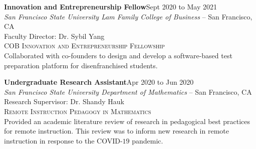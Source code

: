 \documentclass[hidelinks, 10pt]{article}
\begin{document}
{{\vspace{4mm}

\begin{minipage}[ct]{0.9\linewidth}
\textbf{Innovation and Entrepreneurship Fellow}\hfill Sept 2020 to May 2021\\
\emph{San Francisco State University Lam Family College of Business} -- San Francisco, CA\\
Faculty Director: Dr. Sybil Yang\\
{\textsc{COB Innovation and Entrepreneurship Fellowship}}
\vspace{1mm}\\
Collaborated with co-founders to design and develop a software-based test
preparation platform for disenfranchised students.
\end{minipage}

\vspace{4mm}

\begin{minipage}[ct]{0.9\linewidth}
\textbf{Undergraduate Research Assistant}\hfill Apr 2020 to Jun 2020\\
\emph{San Francisco State University Department of Mathematics} -- San Francisco, CA\\
Research Supervisor: Dr. Shandy Hauk\\
{\textsc{Remote Instruction Pedagogy in Mathematics}}
\vspace{1mm}\\
Provided an academic literature review of research in pedagogical best practices
for remote instruction.  This review was to inform new research in remote
instruction in response to the COVID-$19$ pandemic.
\end{minipage}

}}
\end{document}
